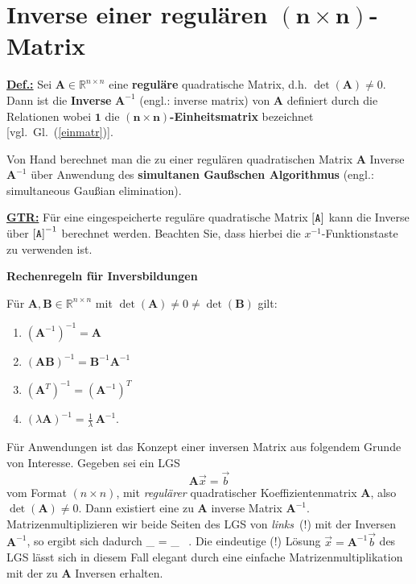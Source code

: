 \section[Inverse einer regul\"{a}ren $(n\times n)$-Matrix]%
{Inverse einer regul\"{a}ren $\boldsymbol{(n\times n)}$-Matrix}

\noindent
\underline{\bf Def.:}
Sei $\mathbf{A} \in
\mathbb{R}^{n \times n}$ eine {\bf regul\"are}
quadratische Matrix, d.h. $\det(\mathbf{A}) \neq 0$. Dann ist
die {\bf Inverse} $\mathbf{A}^{-1}$ (engl.: inverse matrix) von 
$\mathbf{A}$ definiert durch die Relationen
%
\be
{}
\ee
%
wobei $\mathbf{1}$ die $\boldsymbol{(n \times 
n)}${\bf-Einheitsmatrix} bezeichnet [vgl.\ Gl.~(\ref{einmatr})].

\medskip
\noindent
Von Hand berechnet man die zu einer regul\"aren quadratischen
Matrix $\mathbf{A}$ Inverse $\mathbf{A}^{-1}$ \"uber
Anwendung des {\bf simultanen Gau\ss schen Algorithmus} (engl.: 
simultaneous Gau\ss ian elimination).

\medskip
\noindent
\underline{\bf GTR:} F\"ur eine eingespeicherte regul\"are
quadratische Matrix ${\tt [A]}$ kann die Inverse \"uber
${\tt [A]}^{-1}$ berechnet werden. Beachten Sie, dass
hierbei die $x^{-1}$-Funktionstaste zu verwenden ist.

\pagebreak
\medskip
\noindent
{\bf Rechenregeln f\"ur Inversbildungen}

\nopagebreak
\noindent
F\"ur $\mathbf{A},\mathbf{B} \in \mathbb{R}^{n \times n}$
mit $\det(\mathbf{A}) \neq 0 \neq \det(\mathbf{B})$
gilt:

\begin{enumerate}
\item $(\mathbf{A}^{-1})^{-1} = \mathbf{A}$
\item $(\mathbf{A}\mathbf{B})^{-1}
= \mathbf{B}^{-1}\mathbf{A}^{-1}$
\item $(\mathbf{A}^{T})^{-1} = (\mathbf{A}^{-1})^{T}$
\item $\displaystyle (\lambda\mathbf{A})^{-1}
= \frac{1}{\lambda}\,\mathbf{A}^{-1}$.
\end{enumerate}

\medskip
\noindent
F\"ur Anwendungen ist das Konzept einer inversen Matrix
aus folgendem Grunde von Interesse. Gegeben sei ein LGS
\[
\mathbf{A}\vec{x}=\vec{b}
\]
vom Format $(n \times n)$, mit {\em regul\"arer\/} quadratischer
Koeffizientenmatrix $\mathbf{A}$, also $\det(\mathbf{A})
\neq 0$. Dann existiert eine zu $\mathbf{A}$ inverse Matrix
$\mathbf{A}^{-1}$. Matrizenmultiplizieren wir beide Seiten des
LGS von {\em links\/}~(!) mit der Inversen $\mathbf{A}^{-1}$,
so ergibt sich dadurch
%
\be
{}_{}
= _{} \ .
\ee
%
Die eindeutige (!) L\"osung $\vec{x}=\mathbf{A}^{-1}\vec{b}$ des
LGS l\"asst sich in diesem Fall elegant durch eine einfache
Matrizenmultiplikation mit der zu $\mathbf{A}$ Inversen erhalten.

